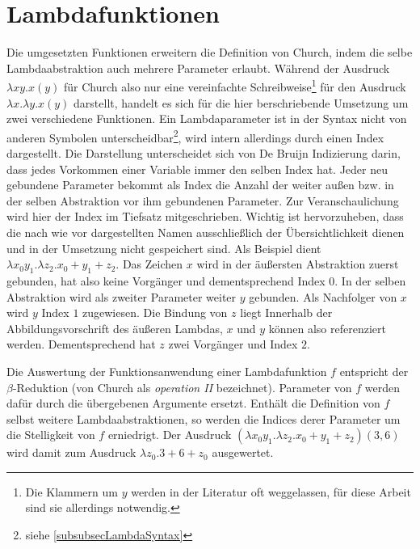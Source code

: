 \section{Lambdafunktionen} \label{subsecLambdafunktionen}
Die umgesetzten Funktionen erweitern die Definition von Church, indem die selbe Lambdaabstraktion auch mehrere Parameter erlaubt. Während der Ausdruck $\lambda x y . x(y)$ für Church also nur eine vereinfachte Schreibweise\footnote{Die Klammern um $y$ werden in der Literatur oft weggelassen, für diese Arbeit sind sie allerdings notwendig.} für den Ausdruck $\lambda x .\lambda y .x(y)$ darstellt, handelt es sich für die hier berschriebende Umsetzung um zwei verschiedene Funktionen. 
Ein Lambdaparameter ist in der Syntax nicht von anderen Symbolen unterscheidbar\footnote{siehe \ref{subsubsecLambdaSyntax}}, wird intern allerdings durch einen Index dargestellt. Die Darstellung unterscheidet sich von De Bruijn Indizierung \cite{deBruijn} darin, dass jedes Vorkommen einer Variable immer den selben Index hat.
 Jeder neu gebundene Parameter bekommt als Index die Anzahl der weiter außen bzw. in der selben Abstraktion vor ihm gebundenen Parameter. Zur Veranschaulichung wird hier der Index im Tiefsatz mitgeschrieben. Wichtig ist hervorzuheben, dass die nach wie vor dargestellten Namen ausschließlich der Übersichtlichkeit dienen und in der Umsetzung nicht gespeichert sind.
 Als Beispiel dient $\lambda x_0 y_1 .\lambda z_2 .x_0 + y_1 + z_2$. Das Zeichen $x$ wird in der äußersten Abstraktion zuerst gebunden, hat also keine Vorgänger und dementsprechend Index $0$. In der selben Abstraktion wird als zweiter Parameter weiter $y$ gebunden. Als Nachfolger von $x$ wird $y$ Index $1$ zugewiesen. Die Bindung von $z$ liegt Innerhalb der Abbildungsvorschrift des äußeren Lambdas, $x$ und $y$ können also referenziert werden. Dementsprechend hat $z$ zwei Vorgänger und Index $2$. 
 
 Die Auswertung der Funktionsanwendung einer Lambdafunktion $f$ entspricht der $\beta$-Reduktion (von Church \cite{ChurchLambda36} als \emph{operation II} bezeichnet). Parameter von $f$ werden dafür durch die übergebenen Argumente ersetzt. Enthält die Definition von $f$ selbst weitere Lambdaabstraktionen, so werden die Indices derer Parameter um die Stelligkeit von $f$ erniedrigt.
 Der Ausdruck $(\lambda x_0 y_1 .\lambda z_2 .x_0 + y_1 + z_2)(3, 6)$ wird damit zum Ausdruck $\lambda z_0 .3 + 6 + z_0$ ausgewertet.
 
